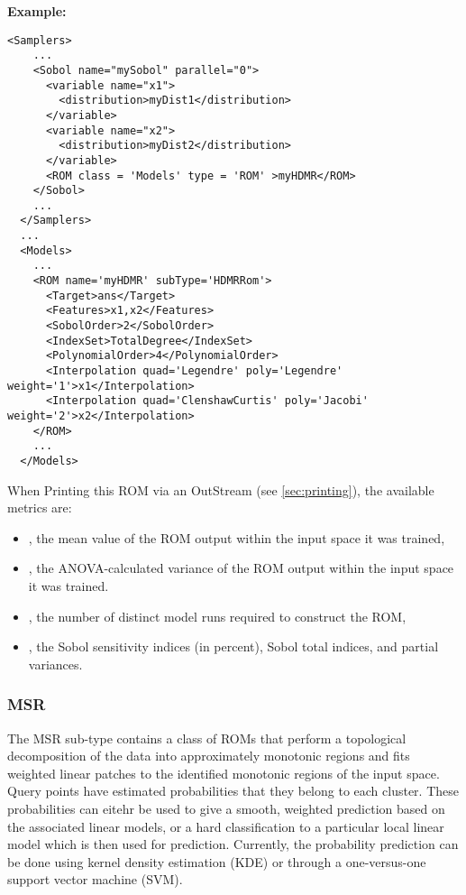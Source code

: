 \textbf{Example:}
{\footnotesize
\begin{lstlisting}[style=XML,morekeywords={name,subType}]
  <Samplers>
    ...
    <Sobol name="mySobol" parallel="0">
      <variable name="x1">
        <distribution>myDist1</distribution>
      </variable>
      <variable name="x2">
        <distribution>myDist2</distribution>
      </variable>
      <ROM class = 'Models' type = 'ROM' >myHDMR</ROM>
    </Sobol>
    ...
  </Samplers>
  ...
  <Models>
    ...
    <ROM name='myHDMR' subType='HDMRRom'>
      <Target>ans</Target>
      <Features>x1,x2</Features>
      <SobolOrder>2</SobolOrder>
      <IndexSet>TotalDegree</IndexSet>
      <PolynomialOrder>4</PolynomialOrder>
      <Interpolation quad='Legendre' poly='Legendre' weight='1'>x1</Interpolation>
      <Interpolation quad='ClenshawCurtis' poly='Jacobi' weight='2'>x2</Interpolation>
    </ROM>
    ...
  </Models>
\end{lstlisting}
}

When Printing this ROM via an OutStream (see \ref{sec:printing}), the available metrics are:
\begin{itemize}
  \item {}, the mean value of the ROM output within the input space it was trained,
  \item {}, the ANOVA-calculated variance of the ROM output within the input space it
    was trained.
  \item {}, the number of distinct model runs required to construct the ROM,
  \item {}, the Sobol sensitivity indices (in percent), Sobol total indices, and partial variances.
\end{itemize}

\subsubsection{MSR}
\label{subsubsec:MSR}
The MSR sub-type contains a class of ROMs that perform a topological
decomposition of the data into approximately monotonic regions and fits weighted
linear patches to the identified monotonic regions of the input space. Query
points have estimated probabilities that they belong to each cluster. These
probabilities can eitehr be used to give a smooth, weighted prediction based on
the associated linear models, or a hard classification to a particular local
linear model which is then used for prediction. Currently, the probability
prediction can be done using kernel density estimation (KDE) or through a
one-versus-one support vector machine (SVM).
%

